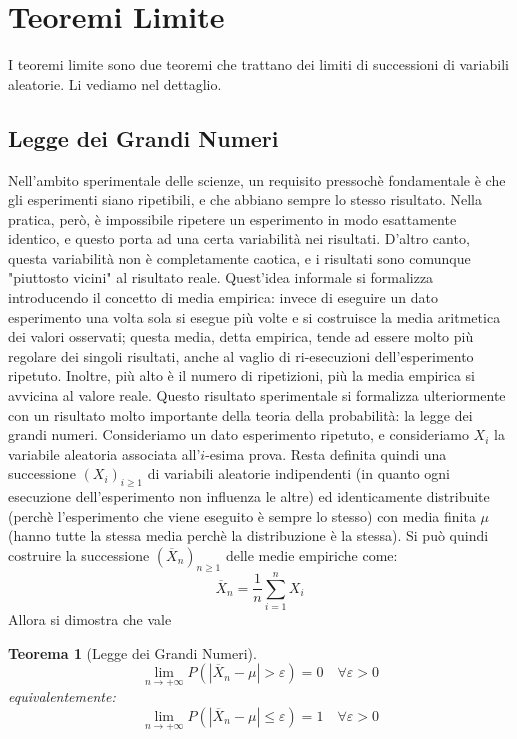 \documentclass{article}
\theoremstyle{plain}
\newtheorem{teorema}{Teorema}[section]
\theoremstyle{definition}
\theoremstyle{remark}
\begin{document}
\section{Teoremi Limite} %
\label{sec:teoremi_limite}
I teoremi limite sono due teoremi che trattano dei limiti di successioni di variabili aleatorie. Li vediamo nel dettaglio.
\subsection{Legge dei Grandi Numeri} %
\label{sub:legge_dei_grandi_numeri}
Nell'ambito sperimentale delle scienze, un requisito pressochè fondamentale è che gli esperimenti siano ripetibili, e che abbiano sempre lo stesso risultato. Nella pratica, però, è impossibile ripetere un esperimento in modo esattamente identico, e questo porta ad una certa variabilità nei risultati. D'altro canto, questa variabilità non è completamente caotica, e i risultati sono comunque "piuttosto vicini" al risultato reale. Quest'idea informale si formalizza introducendo il concetto di media empirica: invece di eseguire un dato esperimento una volta sola si esegue più volte e si costruisce la media aritmetica dei valori osservati; questa media, detta empirica, tende ad essere molto più regolare dei singoli risultati, anche al vaglio di ri-esecuzioni dell'esperimento ripetuto. Inoltre, più alto è il numero di ripetizioni, più la media empirica si avvicina al valore reale. Questo risultato sperimentale si formalizza ulteriormente con un risultato molto importante della teoria della probabilità: la legge dei grandi numeri. Consideriamo un dato esperimento ripetuto, e consideriamo $X_i$ la variabile aleatoria associata all'$i$-esima prova. Resta definita quindi una successione $(X_i)_{i\geq1}$ di variabili aleatorie indipendenti (in quanto ogni esecuzione dell'esperimento non influenza le altre) ed identicamente distribuite (perchè l'esperimento che viene eseguito è sempre lo stesso) con media finita $\mu$ (hanno tutte la stessa media perchè la distribuzione è la stessa). Si può quindi costruire la successione $(\overline{X}_n)_{n\geq1}$ delle medie empiriche come:
\begin{equation*}
	\overline{X}_n=\frac{1}{n}\sum_{i=1}^nX_i
\end{equation*}
Allora si dimostra che vale
\begin{teorema}[Legge dei Grandi Numeri]
	\begin{equation*}
		\lim_{n\to+\infty}P(|\overline{X}_n-\mu|>\varepsilon)=0\quad\forall\varepsilon>0
	\end{equation*}
	equivalentemente:
	\begin{equation*}
		\lim_{n\to+\infty}P(|\overline{X}_n-\mu|\leq\varepsilon)=1\quad\forall\varepsilon>0
	\end{equation*}
\end{teorema}
\end{document}
